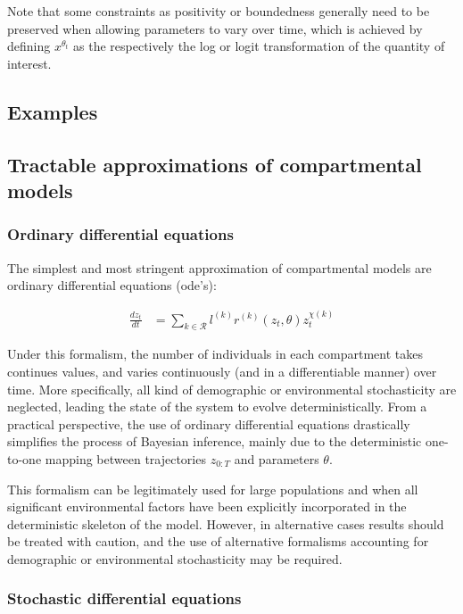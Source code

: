 \documentclass[a4paper,11pt]{article}
\begin{document}
Note that some constraints as positivity or boundedness generally need to be preserved when allowing parameters to vary over time, which is achieved by defining $x^{\theta_t}$ as the respectively the log or logit transformation of the quantity of interest. 


\subsection{Examples}
\subsection{Tractable approximations of compartmental models}
\subsubsection{Ordinary differential equations}

The simplest and most stringent approximation of compartmental models are ordinary differential equations (ode's):

\begin{align}
	\frac{dz_t}{dt}&=  \sum_{k \in \mathcal{R}} l^{(k)}  r^{(k)} (z_t,\theta) z^{\chi(k)}_t
\end{align}


Under this formalism, the number of individuals in each compartment takes continues values, and varies continuously (and in a differentiable manner) over time. More specifically, all kind of demographic or environmental stochasticity are neglected, leading  the state of the system to evolve deterministically. From a practical perspective, the use of ordinary differential equations drastically simplifies the process of Bayesian inference, mainly due to the deterministic one-to-one mapping between trajectories $z_{0:T}$ and parameters $\theta$.

This formalism can be legitimately used for large populations and when all significant environmental factors have been explicitly incorporated in the deterministic skeleton of the model. However, in alternative cases results should be treated with caution, and the use of alternative formalisms accounting for  demographic or environmental stochasticity may be required.



\subsubsection{Stochastic differential equations}
\end{document}
